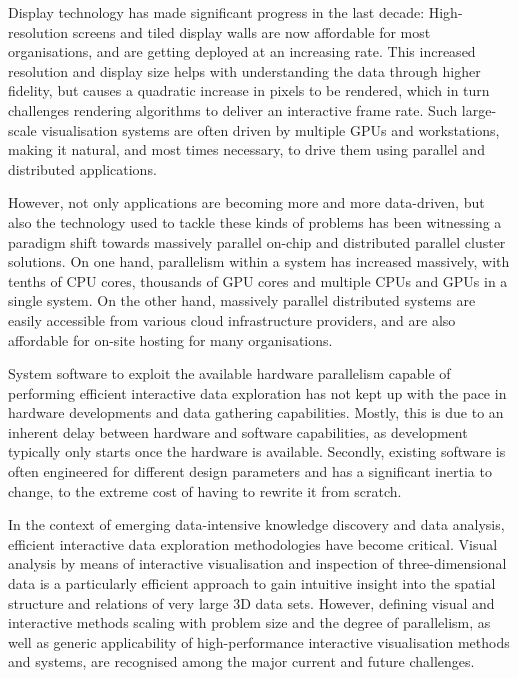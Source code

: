 Display technology has made significant progress in the last decade:
High-resolution screens and tiled display walls are now affordable for most
organisations, and are getting deployed at an increasing rate. This increased
resolution and display size helps with understanding the data through higher
fidelity, but causes a quadratic increase in pixels to be rendered, which in
turn challenges rendering algorithms to deliver an interactive frame rate. Such
large-scale visualisation systems are often driven by multiple GPUs and
workstations, making it natural, and most times necessary, to drive them using
parallel and distributed applications.

However, not only applications are becoming more and more data-driven, but also
the technology used to tackle these kinds of problems has been witnessing a
paradigm shift towards massively parallel on-chip and distributed parallel
cluster solutions. On one hand, parallelism within a system has increased
massively, with tenths of CPU cores, thousands of GPU cores and multiple CPUs
and GPUs in a single system. On the other hand, massively parallel distributed
systems are easily accessible from various cloud infrastructure providers, and
are also affordable for on-site hosting for many organisations.

System software to exploit the available hardware parallelism capable of
performing efficient interactive data exploration has not kept up with the pace
in hardware developments and data gathering capabilities. Mostly, this is
due to an inherent delay between hardware and software capabilities, as
development typically only starts once the hardware is available. Secondly,
existing software is often engineered for different design parameters and
has a significant inertia to change, to the extreme cost of having to rewrite
it from scratch.

In the context of emerging data-intensive knowledge discovery and data analysis,
efficient interactive data exploration methodologies have become critical.
Visual analysis by means of interactive visualisation and inspection
of three-dimensional data is a particularly efficient approach to gain intuitive
insight into the spatial structure and relations of very large 3D data sets.
However, defining visual and interactive methods scaling with problem size and the
degree of parallelism, as well as generic applicability of high-performance
interactive visualisation methods and systems, are recognised among the major
current and future challenges.


